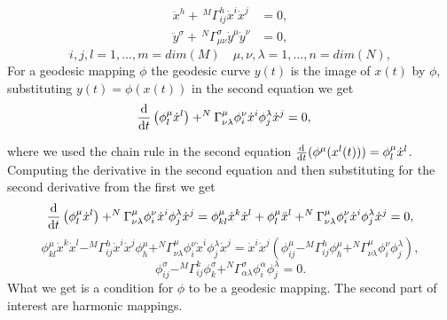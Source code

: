 \documentclass[english]{article}
\begin{document}
\begin{align*}
\ddot{x}^h+\,^M\Gamma^h_{ij}\dot{x}^i\dot{x}^j&=0,\\
\ddot{y}^\sigma+\,^N\Gamma^\sigma_{\mu\nu}\dot{y}^\mu\dot{y}^\nu&=0,
\end{align*}
$$
i,j,l=1,\ldots,m=dim(M) \quad \mu,\nu,\lambda=1,\ldots,n=dim(N),
$$
For a geodesic mapping $\phi$ the geodesic curve $y(t)$ is the image of $x(t)$ by $\phi$, substituting  $y(t)=\phi(x(t))$ in the second equation we get
\begin{align*}
\frac{{\rm d}}{{\rm d}t}\left(\phi^\mu_l\dot{x}^l\right)+^N\Gamma^\mu_{\nu\lambda}\phi^\nu_i\dot{x}^i\phi^\lambda_j\dot{x}^j&=0,
\end{align*}


where we used the chain rule in the second equation $\frac{{\rm d}}{{\rm d}t}(\phi^\mu(x^l(t)))=\phi^\mu_l\dot{x}^l$. Computing the derivative in the second equation and then substituting for the second derivative from the first we get
$$
\frac{{\rm d}}{{\rm d}t}\left(\phi^\mu_l\dot{x}^l\right)+^N\Gamma^\mu_{\nu\lambda}\phi^\nu_i\dot{x}^i\phi^\lambda_j\dot{x}^j=\phi^\mu_{kl}\dot{x}^k\dot{x}^l+\phi^\mu_l\ddot{x}^l+^N\Gamma^\mu_{\nu\lambda}\phi^\nu_i\dot{x}^i\phi^\lambda_j\dot{x}^j=0,
$$
$$
\phi^\mu_{kl}\dot{x}^k\dot{x}^l - ^M\Gamma^h_{ij}\dot{x}^i\dot{x}^j\phi^\mu_h+^N\Gamma^\mu_{\nu\lambda}\phi^\nu_i\dot{x}^i\phi^\lambda_j\dot{x}^j=\dot{x}^i\dot{x}^j\left(\phi^\mu_{ij}-^M\Gamma^h_{ij}\phi^\mu_h+^N\Gamma^\mu_{\nu\lambda}\phi^\nu_i\phi^\lambda_j\right),
$$
\begin{equation}
\label{rce}
\phi^\sigma_{ij}-^M\Gamma^k_{ij}\phi^\sigma_k+^N\Gamma^\sigma_{\alpha\lambda}\phi^\alpha_i\phi^\lambda_j=0.
\end{equation}
What we get is a condition for $\phi$ to be a geodesic mapping. The second part of interest are harmonic mappings.
\end{document}
